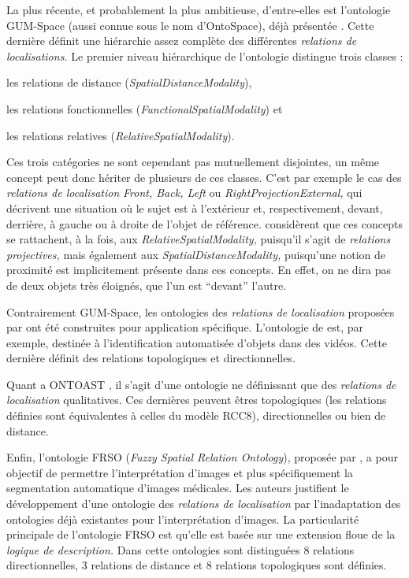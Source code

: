 La plus récente, et probablement la plus ambitieuse, d'entre-elles est
l'ontologie GUM-Space (aussi connue sous le nom d'OntoSpace), déjà
présentée \autocite{Bateman2010}.  Cette dernière définit une
hiérarchie assez complète des différentes \emph{relations de
  localisations.} Le premier niveau hiérarchique de l'ontologie
distingue trois classes :
% 
\begin{enumerate*}
\item les relations de distance (\emph{SpatialDistanceModality}),
\item les relations fonctionnelles
  (\emph{FunctionalSpatialModality}) et
\item les relations relatives (\emph{RelativeSpatialModality}).
\end{enumerate*}
% 
Ces trois catégories ne sont cependant pas mutuellement disjointes, un
même concept peut donc hériter de plusieurs de ces classes. C'est par
exemple le cas des \emph{relations de localisation} \emph{Front, Back,
  Left} ou \emph{RightProjectionExternal,} qui décrivent une situation
où le sujet est à l'extérieur et, respectivement, devant, derrière, à
gauche ou à droite de l'objet de référence. \textcite{Bateman2010}
considèrent que ces concepts se rattachent, à la fois, aux
\emph{RelativeSpatialModality,} puisqu'il s'agit de \emph{relations
  projectives,} mais également aux \emph{SpatialDistanceModality,}
puisqu'une notion de proximité est implicitement présente dans ces
concepts. En effet, on ne dira pas de deux objets très éloignés, que
l'un est \enquote{devant} l'autre.

Contrairement GUM-Space, les ontologies des \emph{relations de
  localisation} proposées par
\textcite{Dasiopoulou2005,Miron2007,Hudelot2008a} ont été construites
pour application spécifique. L'ontologie de \textcite{Dasiopoulou2005}
est, par exemple, destinée à l'identification automatisée d'objets
dans des vidéos. Cette dernière définit des relations topologiques et
directionnelles. 

Quant a ONTOAST \autocite{Miron2007}, il s'agit d'une ontologie ne
définissant que des \emph{relations de localisation} qualitatives. Ces
dernières peuvent êtres topologiques (les relations définies sont
équivalentes à celles du modèle RCC8), directionnelles ou bien de
distance.

Enfin, l'ontologie FRSO (\emph{Fuzzy Spatial Relation Ontology}),
proposée par \textcite{Hudelot2008a}, a pour objectif de permettre
l’interprétation d'images et plus spécifiquement la segmentation
automatique d'images médicales. Les auteurs justifient le
développement d'une ontologie des \emph{relations de localisation} par
l'inadaptation des ontologies déjà existantes pour l'interprétation
d'images.
%
La particularité principale de l'ontologie FRSO est qu'elle est basée
sur une extension floue de la \emph{logique de description.}
%
Dans cette ontologies sont distinguées 8 relations directionnelles, 3
relations de distance et 8 relations topologiques sont définies.

